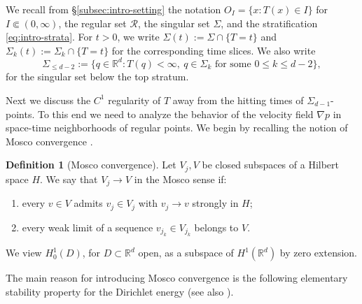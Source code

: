 \documentclass[11pt]{amsart}
\numberwithin{equation}{section}
\numberwithin{figure}{section}
\theoremstyle{plain}
\theoremstyle{definition}
\newtheorem{defn}[thm]{Definition}
\theoremstyle{remark}
\theoremstyle{plain}
\def\R{\mathbb{R}}
\begin{document}
We recall from \S\ref{subsec:intro-setting} the notation
\(O_I=\{x:T(x)\in I\}\) for \(I\Subset(0,\infty)\), the regular set
\(\mathcal R\), the singular set \(\Sigma\), and the stratification
\eqref{eq:intro-strata}.  For \(t>0\), we write
\(\Sigma(t):=\Sigma\cap\{T=t\}\) and
\(\Sigma_k(t):=\Sigma_k\cap\{T=t\}\) for the corresponding time slices.  We also write
\[
    \Sigma_{\leq d-2}
    :=\{q\in\R^d:T(q)<\infty,\ q\in \Sigma_k
    \text{ for some }0\leq k\leq d-2\},
\]
for the singular set below the top stratum.




Next we discuss the $C^1$ regularity of $T$ away from the hitting times of $\Sigma_{d-1}$-points. To this end we need to analyze the behavior of the velocity field $\nabla p$ in space-time neighborhoods of regular points. We begin by recalling the notion of Mosco convergence \cite{Mosco69}.

\begin{defn}[Mosco convergence]\label{defn:mosco}
Let $V_j,V$ be closed subspaces of a Hilbert space $H$. We say that $V_j\to V$ in the Mosco sense if:
\begin{enumerate}
\item[(i)] every $v\in V$ admits $v_j\in V_j$ with $v_j\to v$ strongly in $H$;
\item[(ii)] every weak limit of a sequence $v_{j_k}\in V_{j_k}$ belongs to $V$.
\end{enumerate}
\end{defn}

We view $H^1_0(D)$, for $D\subset\R^d$ open, as a subspace of $H^1(\R^d)$ by zero extension.

The main reason for introducing Mosco convergence is the following elementary stability property for the Dirichlet energy (see also \cite[Thm.~3.3]{Daners03}).
\end{document}
